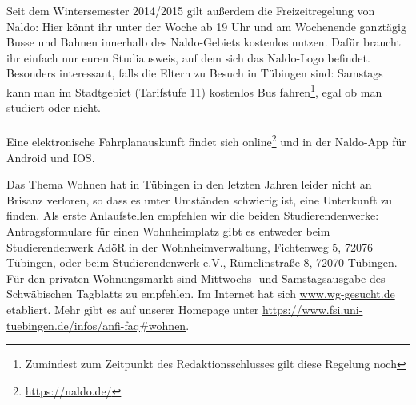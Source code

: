 Seit dem Wintersemester 2014/2015 gilt außerdem die Freizeitregelung von Naldo: Hier könnt ihr unter der Woche ab 19 Uhr und am Wochenende ganztägig Busse und Bahnen innerhalb des Naldo-Gebiets kostenlos nutzen. Dafür braucht ihr einfach nur euren Studiausweis, auf dem sich das Naldo-Logo befindet.
Besonders interessant, falls die Eltern zu Besuch in Tübingen sind: Samstags kann man im Stadtgebiet (Tarifstufe 11) kostenlos Bus fahren\footnote{Zumindest zum Zeitpunkt des Redaktionsschlusses gilt diese Regelung noch}, egal ob man studiert oder nicht. \\\\
Eine elektronische Fahrplanauskunft findet sich online\footnote{\url{https://naldo.de/}} und in der Naldo-App für Android und IOS.

Das Thema Wohnen hat in Tübingen in den letzten Jahren leider nicht an Brisanz verloren, so dass
es unter Umständen schwierig ist, eine Unterkunft zu finden. Als erste Anlaufstellen empfehlen wir
die beiden Studierendenwerke: Antragsformulare für einen Wohnheimplatz gibt es entweder beim
Studierendenwerk AdöR in der Wohnheimverwaltung, Fichtenweg 5, 72076 Tübingen, oder beim Studierendenwerk
e.V., Rümelinstraße 8, 72070 Tübingen. Für den privaten Wohnungsmarkt sind Mittwochs- und Samstagsausgabe
des Schwäbischen Tagblatts zu empfehlen.
Im Internet hat sich \url{www.wg-gesucht.de} etabliert. Mehr gibt es auf unserer Homepage unter \url{https://www.fsi.uni-tuebingen.de/infos/anfi-faq\#wohnen}.
\fi
